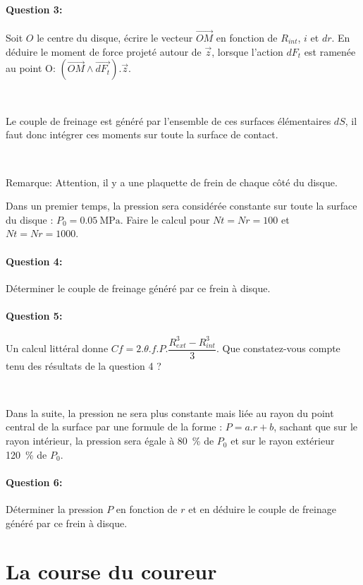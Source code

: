 \paragraph{Question 3:} Soit $O$ le centre du disque, écrire le vecteur $\overrightarrow{OM}$ en fonction de $R_{int}$, $i$ et $dr$. En déduire le moment de force projeté autour de $\overrightarrow{z}$, lorsque l'action $dF_t$ est ramenée au point O: $(\overrightarrow{OM}\wedge \overrightarrow{dF_t}).\overrightarrow{z}$.

~\

Le couple de freinage est généré par l'ensemble de ces surfaces élémentaires $dS$, il faut donc intégrer ces moments sur toute la surface de contact.

~\

Remarque: Attention, il y a une plaquette de frein de chaque côté du disque.

Dans un premier temps, la pression sera considérée constante sur toute la surface du disque : $P_0=\SI{0,05}{\mega\pascal}$. Faire le calcul pour $Nt=Nr=100$ et $Nt=Nr=1000$.

\paragraph{Question 4:} Déterminer le couple de freinage généré par ce frein à disque.

\paragraph{Question 5:} Un calcul littéral donne $Cf=2.\theta.f.P.\dfrac{R_{ext}^3-R_{int}^3}{3}$. Que constatez-vous compte tenu des résultats de la question 4 ?

~\

Dans la suite, la pression ne sera plus constante mais liée au rayon du point central de la surface par une formule de la forme : $P=a.r+b$, sachant que sur le rayon intérieur, la pression sera égale à \SI{80}{\percent} de $P_0$ et sur le rayon extérieur \SI{120}{\percent} de $P_0$.

\paragraph{Question 6:} Déterminer la pression $P$ en fonction de $r$ et en déduire le couple de freinage généré par ce frein à disque.

\section{La course du coureur}

